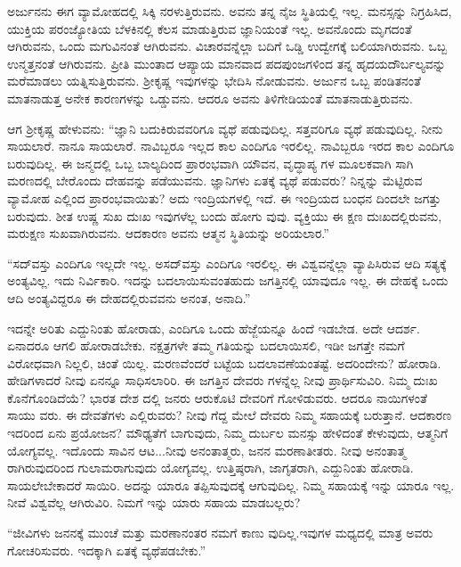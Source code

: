ಅರ್ಜುನನು ಈಗ ವ್ಯಾಮೋಹದಲ್ಲಿ ಸಿಕ್ಕಿ ನರಳುತ್ತಿರುವನು. ಅವನು ತನ್ನ ನೈಜ ಸ್ಥಿತಿಯಲ್ಲಿ ಇಲ್ಲ. ಮನಸ್ಸನ್ನು ನಿಗ್ರಹಿಸಿದ, ಯುಕ್ತಿಯ ಪರಂಜ್ಯೋತಿಯ ಬೆಳಕಿನಲ್ಲಿ ಕೆಲಸ ಮಾಡುತ್ತಿರುವ ಜ್ಞಾನಿಯಂತೆ ಇಲ್ಲ. ಅವನೊಂದು ಮೃಗದಂತೆ ಆಗಿರುವನು, ಒಂದು ಮಗುವಿನಂತೆ ಆಗಿರುವನು. ವಿಚಾರವನ್ನೆಲ್ಲಾ ಬದಿಗೆ ಒಡ್ಡಿ ಉದ್ವೇಗಕ್ಕೆ ಬಲಿಯಾಗಿರುವನು. ಒಬ್ಬ ಉನ್ಮತ್ತನಂತೆ ಆಗಿರುವನು. ಪ್ರೀತಿ ಮುಂತಾದ ಆಪ್ಯಾಯ ಮಾನವಾದ ಪದಪುಂಜಗಳಿಂದ ತನ್ನ ಹೃದಯದೌರ್ಬಲ್ಯವನ್ನು ಮರೆಮಾಡಲು ಯತ್ನಿಸುತ್ತಿರುವನು. ಶ‍್ರೀಕೃಷ್ಣ ಇವುಗಳನ್ನು ಭೇದಿಸಿ ನೋಡುವನು. ಅರ್ಜುನ ಒಬ್ಬ ಪಂಡಿತನಂತೆ ಮಾತನಾಡುತ್ತ ಅನೇಕ ಕಾರಣಗಳನ್ನು ಒಡ್ಡುವನು. ಆದರೂ ಅವನು ತಿಳಿಗೇಡಿಯಂತೆ ಮಾತನಾಡುತ್ತಿರುವನು.

ಆಗ ಶ‍್ರೀಕೃಷ್ಣ ಹೇಳುವನು: “ಜ್ಞಾನಿ ಬದುಕಿರುವವರಿಗೂ ವ್ಯಥೆ ಪಡುವುದಿಲ್ಲ. ಸತ್ತವರಿಗೂ ವ್ಯಥೆ ಪಡುವುದಿಲ್ಲ.  ನೀನು ಸಾಯಲಾರೆ. ನಾನೂ ಸಾಯಲಾರೆ. ನಾವಿಬ್ಬರೂ ಇಲ್ಲದ ಕಾಲ ಎಂದಿಗೂ ಇರಲಿಲ್ಲ. ನಾವಿಬ್ಬರೂ ಇರದ ಕಾಲ ಎಂದಿಗೂ ಬರುವುದಿಲ್ಲ. ಈ ಜನ್ಮದಲ್ಲಿ ಒಬ್ಬ ಬಾಲ್ಯದಿಂದ ಪ್ರಾರಂಭವಾಗಿ ಯೌವನ, ವೃದ್ಧಾಪ್ಯ ಗಳ ಮೂಲಕವಾಗಿ ಸಾಗಿ ಮರಣದಲ್ಲಿ ಬೇರೊಂದು ದೇಹವನ್ನು ಪಡೆಯುವನು. ಜ್ಞಾನಿಗಳು ಏತಕ್ಕೆ ವ್ಯಥೆ ಪಡುವರು?  ನಿನ್ನನ್ನು ಮೆಟ್ಟಿರುವ ವ್ಯಾಮೋಹ ಎಲ್ಲಿಂದ ಪ್ರಾರಂಭವಾಯಿತು? ಅದು ಇಂದ್ರಿಯಗಳಲ್ಲಿ ಇದೆ. ಈ ಇಂದ್ರಿಯದ ಬಂಧನ ದಿಂದಲೇ ಜಗತ್ತು ಬರುವುದು. ಶೀತ ಉಷ್ಣ ಸುಖ ದುಃಖ ಇವುಗಳೆಲ್ಲ ಬಂದು ಹೋಗು ವುವು.  ವ್ಯಕ್ತಿಯು ಈ ಕ್ಷಣ ದುಃಖದಲ್ಲಿರುವನು, ಮರುಕ್ಷಣ ಸುಖವಾಗಿರುವನು. ಆದಕಾರಣ ಅವನು ಆತ್ಮನ ಸ್ಥಿತಿಯನ್ನು ಅರಿಯಲಾರ.”

“ಸದ್​ವಸ್ತು ಎಂದಿಗೂ ಇಲ್ಲದೇ ಇಲ್ಲ. ಅಸದ್​ವಸ್ತು ಎಂದಿಗೂ ಇರಲಿಲ್ಲ. ಈ ವಿಶ್ವವನ್ನೆಲ್ಲಾ ವ್ಯಾಪಿಸಿರುವ ಆದಿ ಸತ್ಯಕ್ಕೆ ಅಂತ್ಯವಿಲ್ಲ. ಇದು ನಿರ್ವಿಕಾರಿ. ಇದನ್ನು ಬದಲಾಯಿಸುವಂತಹುದು ಜಗತ್ತಿನಲ್ಲಿ ಯಾವುದೂ ಇಲ್ಲ. ಈ ದೇಹಕ್ಕೆ ಒಂದು ಆದಿ ಅಂತ್ಯವಿದ್ದರೂ ಈ ದೇಹದಲ್ಲಿರುವವನು ಅನಂತ, ಅನಾದಿ.” 

ಇದನ್ನೇ ಅರಿತು ಎದ್ದುನಿಂತು ಹೋರಾಡು, ಎಂದಿಗೂ ಒಂದು ಹೆಜ್ಜೆಯನ್ನೂ ಹಿಂದೆ ಇಡಬೇಡ. ಅದೇ ಆದರ್ಶ. ಏನಾದರೂ ಆಗಲಿ ಹೋರಾಡಬೇಕು. ನಕ್ಷತ್ರಗಳೇ ತಮ್ಮ ಗತಿಯನ್ನು ಬದಲಾಯಿಸಲಿ, ಇಡೀ ಜಗತ್ತೇ ನಮಗೆ ವಿರೋಧವಾಗಿ ನಿಲ್ಲಲಿ, ಚಿಂತೆ ಯಿಲ್ಲ. ಮರಣವೆಂದರೆ ಬಟ್ಟೆಯ ಬದಲಾವಣೆಯಂತಷ್ಟೆ. ಅದರಿಂದೇನು? ಹೋರಾಡಿ. ಹೇಡಿಗಳಾದರೆ ನೀವು ಏನನ್ನೂ ಸಾಧಿಸಲಾರಿರಿ. ಈ ಜಗತ್ತಿನ ದೇವರು ಗಳನ್ನೆಲ್ಲ ನೀವು ಪ್ರಾರ್ಥಿಸುವಿರಿ. ನಿಮ್ಮ ದುಃಖ ಕೊನೆಗೊಂಡಿದೆಯೆ? ಭಾರತ ದೇಶ ದಲ್ಲಿ ಜನರು ಆರುಕೊಟಿ ದೇವರಿಗೆ ಗೋಳಿಡುವರು. ಆದರೂ ನಾಯಿಗಳಂತೆ ಸಾಯು ವರು. ಈ ದೇವತೆಗಳು ಎಲ್ಲಿರುವರು? ನೀವು ಗೆದ್ದ ಮೇಲೆ ದೇವರು ನಿಮ್ಮ ಸಹಾಯಕ್ಕೆ ಬರುತ್ತಾನೆ. ಆದಕಾರಣ ಇದರಿಂದ ಏನು ಪ್ರಯೋಜನ? ಮೌಢ್ಯತೆಗೆ ಬಾಗುವುದು, ನಿಮ್ಮ ದುರ್ಬಲ ಮನಸ್ಸು ಹೇಳಿದಂತೆ ಕೇಳುವುದು, ಆತ್ಮನಿಗೆ ಯೋಗ್ಯವಲ್ಲ. ಇದೊಂದು ಸಾವಿನ ಆಟ...ನೀವು ಅನಂತಾತ್ಮರು, ಜನನ ಮರಣಾತೀತರು. ನೀವು ಅನಂತಾತ್ಮ ರಾಗಿರುವುದರಿಂದ ಗುಲಾಮರಾಗುವುದು ಯೋಗ್ಯವಲ್ಲ. ಉತ್ತಿಷ್ಠರಾಗಿ, ಜಾಗೃತರಾಗಿ, ಎದ್ದುನಿಂತು ಹೋರಾಡಿ. ಸಾಯಲೇಬೇಕಾದರೆ ಸಾಯಿರಿ. ಅದನ್ನು ಯಾರೂ ತಪ್ಪಿಸುವುದಕ್ಕೆ ಆಗುವುದಿಲ್ಲ. ನಿಮ್ಮ ಸಹಾಯಕ್ಕೆ ಇನ್ನು ಯಾರೂ ಇಲ್ಲ. ನೀವೆ ವಿಶ್ವವೆಲ್ಲ ಆಗಿರುವಿರಿ. ನಿಮಗೆ ಇನ್ನು ಯಾರು ಸಹಾಯ ಮಾಡಬಲ್ಲರು?

“ಜೀವಿಗಳು ಜನನಕ್ಕೆ ಮುಂಚೆ ಮತ್ತು ಮರಣಾನಂತರ ನಮಗೆ ಕಾಣು ವುದಿಲ್ಲ.ಇವುಗಳ ಮಧ್ಯದಲ್ಲಿ ಮಾತ್ರ ಅವರು ಗೋಚರಿಸುವರು. ಇದಕ್ಕಾಗಿ ಏತಕ್ಕೆ ವ್ಯಥೆಪಡಬೇಕು.” 

